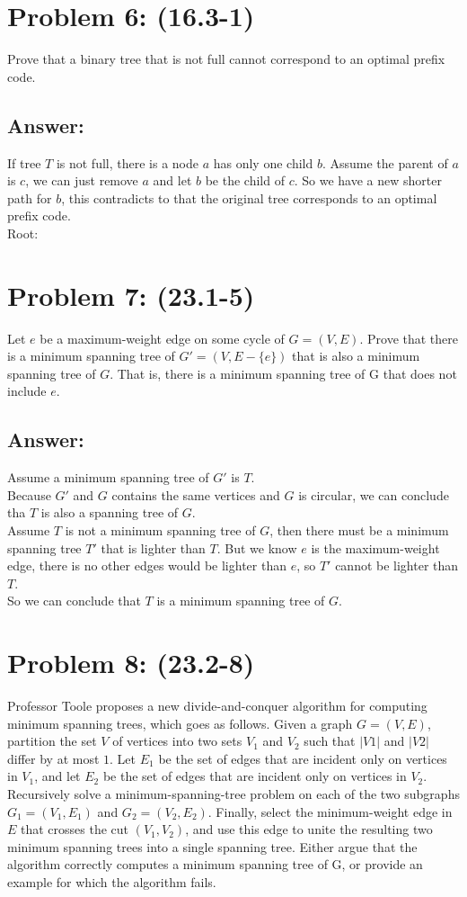 \documentclass[letter]{article}
\begin{document}
\section*{Problem 6: (16.3-1)} Prove that a binary tree that is not full cannot correspond to an optimal prefix code.
\subsection*{Answer:}
If tree $T$ is not full, there is a node $a$ has only one child $b$. Assume the parent of $a$ is $c$, we can just remove $a$ and let $b$ be the child of $c$. So we have a new shorter path for $b$, this contradicts to that the original tree corresponds to an optimal prefix code.\\
Root:

\section*{Problem 7: (23.1-5)} Let $e$ be a maximum-weight edge on some cycle of $G = (V, E)$. Prove that there is a minimum spanning tree of $G' = (V, E -\{e\})$ that is also a minimum spanning tree of $G$. That is, there is a minimum spanning tree of G that does not include $e$.
\subsection*{Answer:}
Assume a minimum spanning tree of $G'$ is $T$.\\
Because $G'$ and $G$ contains the same vertices and $G$ is circular, we can conclude tha $T$ is also a spanning tree of $G$.\\
Assume $T$ is not a minimum spanning tree of $G$, then there must be a minimum spanning tree $T'$ that is lighter than $T$. But we know $e$ is the maximum-weight edge, there is no other edges would be lighter than $e$, so $T'$ cannot be lighter than $T$.\\
So we can conclude that $T$ is a  minimum spanning tree of $G$.

\section*{Problem 8: (23.2-8)} Professor Toole proposes a new divide-and-conquer algorithm for computing minimum spanning trees, which goes as follows. Given a graph $G = (V, E)$, partition the set $V$ of vertices into two sets $V_1$ and $V_2$ such that $|V1|$ and $|V2|$ differ by at most $1$. Let $E_1$ be the set of edges that are incident only on vertices in $V_1$, and let $E_2$ be the set of edges that are incident only on vertices in $V_2$. Recursively solve a minimum-spanning-tree problem on each of the two subgraphs $G_1 = (V_1, E_1)$ and $G_2 = (V_2, E_2)$. Finally, select the minimum-weight edge in $E$ that crosses the cut $(V_1, V_2)$, and use this edge to unite the resulting two minimum spanning trees into a single spanning tree. Either argue that the algorithm correctly computes a minimum spanning tree of G, or provide an example for which the algorithm fails.
\end{document}
